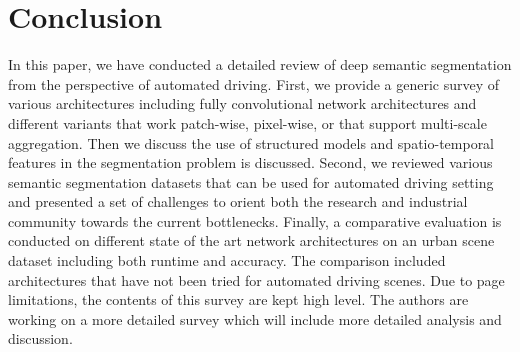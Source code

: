 \documentclass[conference]{IEEEtran}
\begin{document}
\section{Conclusion}\label{sec:conc}
In this paper, we have conducted a detailed review of deep semantic segmentation from the perspective of automated driving. First, we provide a generic survey of various architectures including fully convolutional network architectures and different variants that work patch-wise, pixel-wise, or that support multi-scale aggregation. Then we discuss the use of structured models and spatio-temporal features in the segmentation problem is discussed. Second, we reviewed various semantic segmentation datasets that can be used for automated driving setting and presented a set of challenges to orient both the research and industrial community towards the current bottlenecks. Finally, a comparative evaluation is conducted on different state of the art network architectures on an urban scene dataset including both runtime and accuracy. The comparison included architectures that have not been tried for automated driving scenes. Due to page limitations, the contents of this survey are kept high level. The authors are working on a more detailed survey which will include more detailed  analysis and discussion.






\end{document}
